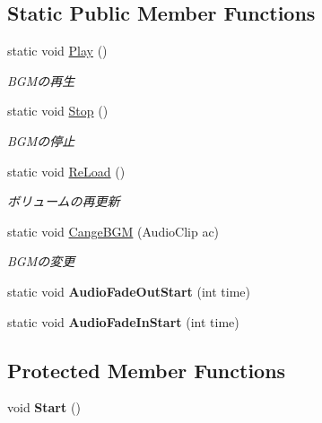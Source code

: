 \subsection*{Static Public Member Functions}
\begin{DoxyCompactItemize}
\item 
static void \hyperlink{class_b_g_m_master_afc8071156c74b4e71a8c093de4edddaa}{Play} ()
\begin{DoxyCompactList}\small\item\em B\+G\+Mの再生 \end{DoxyCompactList}\item 
static void \hyperlink{class_b_g_m_master_a5e92f2d9dd69d2fb621101f56ec7a3c7}{Stop} ()
\begin{DoxyCompactList}\small\item\em B\+G\+Mの停止 \end{DoxyCompactList}\item 
static void \hyperlink{class_b_g_m_master_a46396ea79b4e3aae09ed4b3f99e81c0a}{Re\+Load} ()
\begin{DoxyCompactList}\small\item\em ボリュームの再更新 \end{DoxyCompactList}\item 
static void \hyperlink{class_b_g_m_master_acf1c1947c4c6cf20acc69ed586703fe2}{Cange\+B\+GM} (Audio\+Clip ac)
\begin{DoxyCompactList}\small\item\em B\+G\+Mの変更 \end{DoxyCompactList}\item 
\mbox{\label{class_b_g_m_master_a1527d1ab11010152a3611fa2e6b3c46d}} 
static void {\bfseries Audio\+Fade\+Out\+Start} (int time)
\item 
\mbox{\label{class_b_g_m_master_a85b78b4ae62183a49a73a1ecc1b2f11e}} 
static void {\bfseries Audio\+Fade\+In\+Start} (int time)
\end{DoxyCompactItemize}
\subsection*{Protected Member Functions}
\begin{DoxyCompactItemize}
\item 
\mbox{\label{class_b_g_m_master_ac2ac3860d6ae14a571b22382787ab416}} 
void {\bfseries Start} ()
\end{DoxyCompactItemize}
